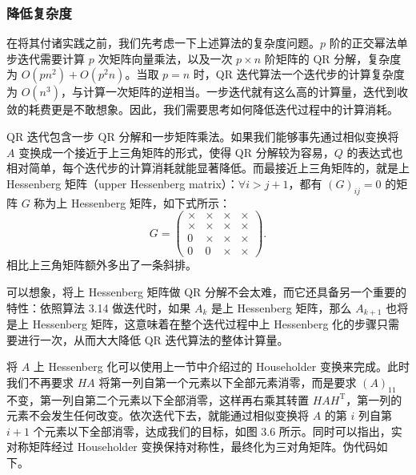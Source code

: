 \subsubsection{降低复杂度}

在将其付诸实践之前，我们先考虑一下上述算法的复杂度问题。$p$ 阶的正交幂法单步迭代需要计算 $p$ 次矩阵向量乘法，以及一次 $p\times n$ 阶矩阵的 QR 分解，复杂度为 $O(pn^2)+O(p^2n)$。当取 $p=n$ 时，QR 迭代算法一个迭代步的计算复杂度为 $O(n^3)$，与计算一次矩阵的逆相当。一步迭代就有这么高的计算量，迭代到收敛的耗费更是不敢想象。因此，我们需要思考如何降低迭代过程中的计算消耗。

QR 迭代包含一步 QR 分解和一步矩阵乘法。如果我们能够事先通过相似变换将 $A$ 变换成一个接近于上三角矩阵的形式，使得 QR 分解较为容易，$Q$ 的表达式也相对简单，每个迭代步的计算消耗就能显著降低。而最接近上三角矩阵的，就是上 Hessenberg 矩阵（upper Hessenberg matrix）：$\forall i>j+1$，都有 $(G)_{ij}=0$ 的矩阵 $G$ 称为上 Hessenberg 矩阵，如下式所示：
\begin{equation}
G=\begin{pmatrix}
\times&\times&\times&\times\\
\times&\times&\times&\times\\
0&\times&\times&\times\\
0&0&\times&\times
\end{pmatrix}.
\tag{3.4.26}
\end{equation}
相比上三角矩阵额外多出了一条斜排。

可以想象，将上 Hessenberg 矩阵做 QR 分解不会太难，而它还具备另一个重要的特性：依照算法 3.14 做迭代时，如果 $A_k$ 是上 Hessenberg 矩阵，那么 $A_{k+1}$ 也将是上 Hessenberg 矩阵，这意味着在整个迭代过程中上 Hessenberg 化的步骤只需要进行一次，从而大大降低 QR 迭代算法的整体计算量。

将 $A$ 上 Hessenberg 化可以使用上一节中介绍过的 Householder 变换来完成。此时我们不再要求 $HA$ 将第一列自第一个元素以下全部元素消零，而是要求 $(A)_{11}$ 不变，第一列自第二个元素以下全部消零，这样再右乘其转置 $HAH^{\mathrm T}$，第一列的元素不会发生任何改变。依次迭代下去，就能通过相似变换将 $A$ 的第 $i$ 列自第 $i+1$ 个元素以下全部消零，达成我们的目标，如图 3.6 所示。同时可以指出，实对称矩阵经过 Householder 变换保持对称性，最终化为三对角矩阵。伪代码如下。

